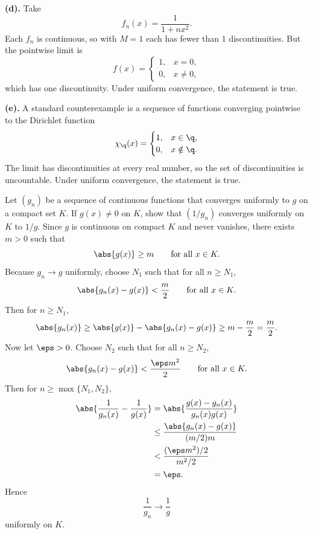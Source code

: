 \begin{problem}[Exercise 6.2.6]
    \textbf{(d).}
    Take
    \[
        f_n(x)=\frac{1}{1+nx^2}.
    \]
    Each $f_n$ is continuous, so with $M=1$ each has fewer than $1$ discontinuities.
    But the pointwise limit is
    \[
        f(x)=
        \begin{cases}
            1,&x=0,\\
            0,&x\neq 0,
        \end{cases}
    \]
    which has one discontinuity.
    Under uniform convergence, the statement is true.

    \textbf{(e).}
    A standard counterexample is a sequence of functions converging pointwise to the Dirichlet function
    \[
        \chi_{\q}(x)=
        \begin{cases}
            1,&x\in\q,\\
            0,&x\notin\q.
        \end{cases}
    \]
    The limit has discontinuities at every real number, so the set of discontinuities is uncountable.
    Under uniform convergence, the statement is true.
\end{problem}

\begin{problem}[Exercise 6.2.8]{
    Let $(g_n)$ be a sequence of continuous functions that converges uniformly to $g$ on a compact set $K$.
    If $g(x)\neq 0$ on $K$, show that $(1/g_n)$ converges uniformly on $K$ to $1/g$.
}
    Since $g$ is continuous on compact $K$ and never vanishes, there exists $m>0$ such that
    \[
        \abs{g(x)}\geq m
        \qquad\text{for all }x\in K.
    \]
    Because $g_n\to g$ uniformly, choose $N_1$ such that for all $n\geq N_1$,
    \[
        \abs{g_n(x)-g(x)}<\frac{m}{2}
        \qquad\text{for all }x\in K.
    \]
    Then for $n\geq N_1$,
    \[
        \abs{g_n(x)}
        \geq
        \abs{g(x)}-\abs{g_n(x)-g(x)}
        \geq
        m-\frac{m}{2}
        =
        \frac{m}{2}.
    \]
    Now let $\eps>0$.
    Choose $N_2$ such that for all $n\geq N_2$,
    \[
        \abs{g_n(x)-g(x)}<\frac{\eps m^2}{2}
        \qquad\text{for all }x\in K.
    \]
    Then for $n\geq \max\{N_1,N_2\}$,
    \begin{align*}
        \abs{\frac1{g_n(x)}-\frac1{g(x)}}
        &=
        \abs{\frac{g(x)-g_n(x)}{g_n(x)g(x)}}\\
        &\leq
        \frac{\abs{g_n(x)-g(x)}}{(m/2)m}\\
        &<
        \frac{(\eps m^2)/2}{m^2/2}\\
        &=
        \eps.
    \end{align*}
    Hence
    \[
        \frac1{g_n}\to\frac1g
    \]
    uniformly on $K$.
\end{problem}

